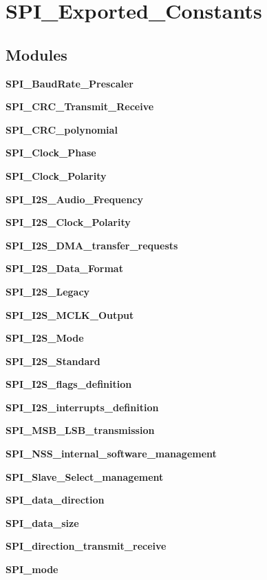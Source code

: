 \section{S\+P\+I\+\_\+\+Exported\+\_\+\+Constants}
\label{group__SPI__Exported__Constants}
\subsection*{Modules}
\begin{DoxyCompactItemize}
\item 
\textbf{ S\+P\+I\+\_\+\+Baud\+Rate\+\_\+\+Prescaler}
\item 
\textbf{ S\+P\+I\+\_\+\+C\+R\+C\+\_\+\+Transmit\+\_\+\+Receive}
\item 
\textbf{ S\+P\+I\+\_\+\+C\+R\+C\+\_\+polynomial}
\item 
\textbf{ S\+P\+I\+\_\+\+Clock\+\_\+\+Phase}
\item 
\textbf{ S\+P\+I\+\_\+\+Clock\+\_\+\+Polarity}
\item 
\textbf{ S\+P\+I\+\_\+\+I2\+S\+\_\+\+Audio\+\_\+\+Frequency}
\item 
\textbf{ S\+P\+I\+\_\+\+I2\+S\+\_\+\+Clock\+\_\+\+Polarity}
\item 
\textbf{ S\+P\+I\+\_\+\+I2\+S\+\_\+\+D\+M\+A\+\_\+transfer\+\_\+requests}
\item 
\textbf{ S\+P\+I\+\_\+\+I2\+S\+\_\+\+Data\+\_\+\+Format}
\item 
\textbf{ S\+P\+I\+\_\+\+I2\+S\+\_\+\+Legacy}
\item 
\textbf{ S\+P\+I\+\_\+\+I2\+S\+\_\+\+M\+C\+L\+K\+\_\+\+Output}
\item 
\textbf{ S\+P\+I\+\_\+\+I2\+S\+\_\+\+Mode}
\item 
\textbf{ S\+P\+I\+\_\+\+I2\+S\+\_\+\+Standard}
\item 
\textbf{ S\+P\+I\+\_\+\+I2\+S\+\_\+flags\+\_\+definition}
\item 
\textbf{ S\+P\+I\+\_\+\+I2\+S\+\_\+interrupts\+\_\+definition}
\item 
\textbf{ S\+P\+I\+\_\+\+M\+S\+B\+\_\+\+L\+S\+B\+\_\+transmission}
\item 
\textbf{ S\+P\+I\+\_\+\+N\+S\+S\+\_\+internal\+\_\+software\+\_\+management}
\item 
\textbf{ S\+P\+I\+\_\+\+Slave\+\_\+\+Select\+\_\+management}
\item 
\textbf{ S\+P\+I\+\_\+data\+\_\+direction}
\item 
\textbf{ S\+P\+I\+\_\+data\+\_\+size}
\item 
\textbf{ S\+P\+I\+\_\+direction\+\_\+transmit\+\_\+receive}
\item 
\textbf{ S\+P\+I\+\_\+mode}
\end{DoxyCompactItemize}
